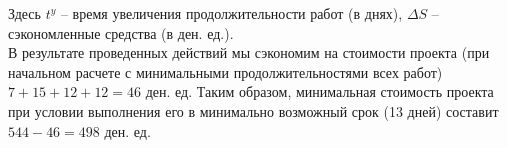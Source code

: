 \documentclass[a4paper, 12pt]{report}
\begin{document}
	Здесь $t^y$ -- время увеличения продолжительности работ (в днях), $\Delta S$ -- сэкономленные средства (в ден. ед.).\\
	В результате проведенных действий мы сэкономим на стоимости проекта (при начальном расчете с минимальными продолжительностями всех работ) $7+15+12+12=46$ ден. ед. Таким образом, минимальная стоимость проекта при условии выполнения его в минимально возможный срок (13 дней) составит $544-46=498$ ден. ед.
\end{document}

